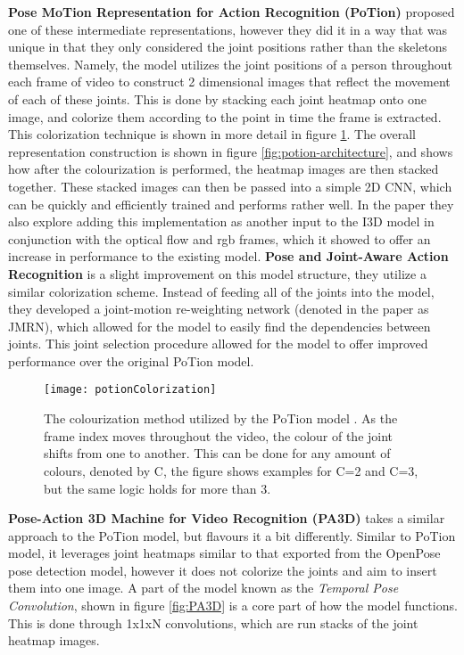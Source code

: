 \textbf{Pose MoTion Representation for Action Recognition (PoTion)} \cite{potion} proposed one of these intermediate representations, however they did it in a way that was unique in that they only considered the joint positions rather than the skeletons themselves. Namely, the model utilizes the joint positions of a person throughout each frame of video to construct 2 dimensional images that reflect the movement of each of these joints. This is done by stacking each joint heatmap onto one image, and colorize them according to the point in time the frame is extracted. This colorization technique is shown in more detail in figure \ref{fig:potion-colourization}. The overall representation construction is shown in figure \ref{fig:potion-architecture}, and shows how after the colourization is performed, the heatmap images are then stacked together. These stacked images can then be passed into a simple 2D CNN, which can be quickly and efficiently trained and performs rather well. In the paper they also explore adding this implementation as another input to the I3D \cite{i3d} model in conjunction with the optical flow and rgb frames, which it showed to offer an increase in performance to the existing model. \textbf{Pose and Joint-Aware Action Recognition} \cite{poseandjointaware} is a slight improvement on this model structure, they utilize a similar colorization scheme. Instead of feeding all of the joints into the model, they developed a joint-motion re-weighting network (denoted in the paper as JMRN), which allowed for the model to easily find the dependencies between joints. This joint selection procedure allowed for the model to offer improved performance over the original PoTion model.

\begin{figure}[h]
	\texttt{[image: potionColorization]}
	\centering
	\caption{The colourization method utilized by the PoTion model \cite{potion}. As the frame index moves throughout the video, the colour of the joint shifts from one to another. This can be done for any amount of colours, denoted by C, the figure shows examples for C=2 and C=3, but the same logic holds for more than 3.}
	\label{fig:potion-colourization}
\end{figure}

\textbf{Pose-Action 3D Machine for Video Recognition (PA3D)} \cite{PA3D} takes a similar approach to the PoTion model, but flavours it a bit differently. Similar to PoTion model, it leverages joint heatmaps similar to that exported from the OpenPose pose detection model, however it does not colorize the joints and aim to insert them into one image. A part of the model known as the \textit{Temporal Pose Convolution}, shown in figure \ref{fig:PA3D} is a core part of how the model functions. This is done through 1x1xN convolutions, which are run stacks of the joint heatmap images.

